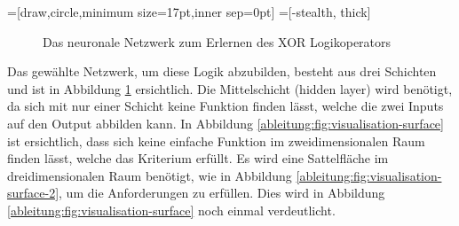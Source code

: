 =[draw,circle,minimum size=17pt,inner sep=0pt]
=[-stealth, thick]
\begin{figure}
	\centering
	\caption{Das neuronale Netzwerk zum Erlernen des XOR Logikoperators}
	\label{ableitung:fig:nn-result-net}
\end{figure}
Das gewählte Netzwerk, um diese Logik abzubilden, besteht aus drei
Schichten und ist in Abbildung \ref{ableitung:fig:nn-result-net}
ersichtlich.
Die Mittelschicht (hidden layer) wird benötigt, da sich mit nur
einer Schicht keine Funktion finden lässt, welche die zwei Inputs auf den Output abbilden kann. 
In Abbildung \ref{ableitung:fig:visualisation-surface} ist ersichtlich, dass sich keine einfache Funktion im zweidimensionalen Raum finden lässt, welche das Kriterium erfüllt. Es wird eine Sattelfläche im dreidimensionalen Raum benötigt, wie in Abbildung \ref{ableitung:fig:visualisation-surface-2}, um die Anforderungen zu erfüllen. 
%
%
Dies wird in Abbildung \ref{ableitung:fig:visualisation-surface}
noch einmal verdeutlicht.

